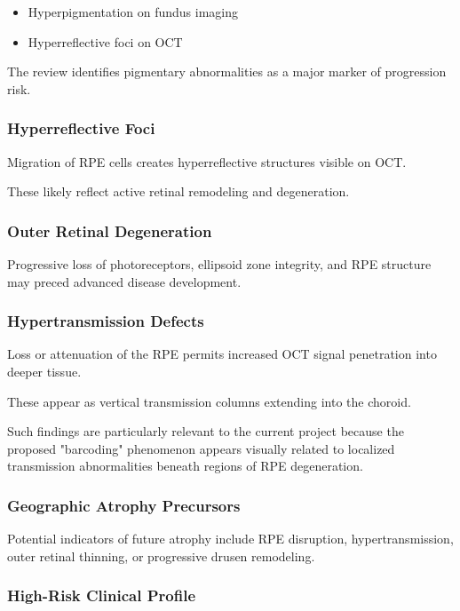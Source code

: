 \documentclass[11pt]{article}
\begin{document}
\begin{itemize}
    \item Hyperpigmentation on fundus imaging
    \item Hyperreflective foci on OCT
\end{itemize}

The review identifies pigmentary abnormalities as a major marker of progression risk.

\subsubsection*{Hyperreflective Foci}

Migration of RPE cells creates hyperreflective structures visible on OCT.

These likely reflect active retinal remodeling and degeneration.

\subsubsection*{Outer Retinal Degeneration}

Progressive loss of photoreceptors, ellipsoid zone integrity, and RPE structure may preced advanced disease development.

\subsubsection*{Hypertransmission Defects}

Loss or attenuation of the RPE permits increased OCT signal penetration into deeper tissue.

These appear as vertical transmission columns extending into the choroid.

Such findings are particularly relevant to the current project because the proposed "barcoding" phenomenon appears visually related to localized transmission abnormalities beneath regions of RPE degeneration.

\subsubsection*{Geographic Atrophy Precursors}

Potential indicators of future atrophy include RPE disruption, hypertransmission, outer retinal thinning, or progressive drusen remodeling.

\subsubsection*{High-Risk Clinical Profile}
\end{document}
